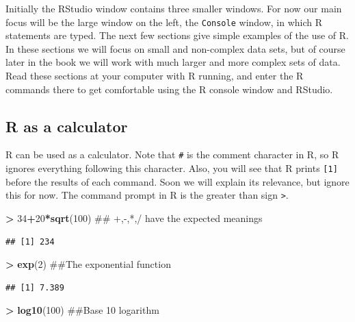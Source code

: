 \documentclass[]{krantz}
\makeatletter
\newenvironment{Shaded}{\begin{snugshade}}{\end{snugshade}}
\newcommand{\KeywordTok}[1]{\textcolor[rgb]{0.27,0.27,0.27}{\textbf{#1}}}
\newcommand{\DecValTok}[1]{\textcolor[rgb]{0.06,0.06,0.06}{#1}}
\newcommand{\StringTok}[1]{\textcolor[rgb]{0.5,0.5,0.5}{#1}}
\newcommand{\OperatorTok}[1]{\textcolor[rgb]{0.43,0.43,0.43}{\textbf{#1}}}
\newcommand{\NormalTok}[1]{#1}
\newenvironment{kframe}{%
\medskip{}
\setlength{\fboxsep}{.8em}
 \def\at@end@of@kframe{}%
 \ifinner\ifhmode%
  \def\at@end@of@kframe{\end{minipage}}%
  \begin{minipage}{\columnwidth}%
 \fi\fi%
 \def\FrameCommand##1{\hskip\@totalleftmargin \hskip-\fboxsep
 \colorbox{shadecolor}{##1}\hskip-\fboxsep
     \hskip-\linewidth \hskip-\@totalleftmargin \hskip\columnwidth}%
 \MakeFramed {\advance\hsize-\width
   \@totalleftmargin\z@ \linewidth\hsize
   \@setminipage}}%
 {\par\unskip\endMakeFramed%
 \at@end@of@kframe}
\renewenvironment{Shaded}{\begin{kframe}}{\end{kframe}}
\theoremstyle{definition}
\theoremstyle{definition}
\theoremstyle{definition}
\theoremstyle{remark}
\makeatother
\begin{document}
Initially the RStudio window contains three smaller windows. For now our
main focus will be the large window on the left, the \texttt{Console}
window, in which R statements are typed. The next few sections give
simple examples of the use of R. In these sections we will focus on
small and non-complex data sets, but of course later in the book we will
work with much larger and more complex sets of data. Read these sections
at your computer with R running, and enter the R commands there to get
comfortable using the R console window and RStudio.

\subsection{R as a calculator}\label{r-as-a-calculator}

R can be used as a calculator. Note that \texttt{\#} is the comment
character in R, so R ignores everything following this character. Also,
you will see that R prints \texttt{{[}1{]}} before the results of each
command. Soon we will explain its relevance, but ignore this for now.
The command prompt in R is the greater than sign
\texttt{\textgreater{}}.

\begin{Shaded}
\begin{Highlighting}[]
\OperatorTok{>}\StringTok{ }\DecValTok{34}\OperatorTok{+}\DecValTok{20}\OperatorTok{*}\KeywordTok{sqrt}\NormalTok{(}\DecValTok{100}\NormalTok{)  ## +,-,*,/ have the expected meanings}
\end{Highlighting}
\end{Shaded}

\begin{verbatim}
## [1] 234
\end{verbatim}

\begin{Shaded}
\begin{Highlighting}[]
\OperatorTok{>}\StringTok{ }\KeywordTok{exp}\NormalTok{(}\DecValTok{2}\NormalTok{)  ##The exponential function}
\end{Highlighting}
\end{Shaded}

\begin{verbatim}
## [1] 7.389
\end{verbatim}

\begin{Shaded}
\begin{Highlighting}[]
\OperatorTok{>}\StringTok{ }\KeywordTok{log10}\NormalTok{(}\DecValTok{100}\NormalTok{)  ##Base 10 logarithm}
\end{Highlighting}
\end{Shaded}
\end{document}
